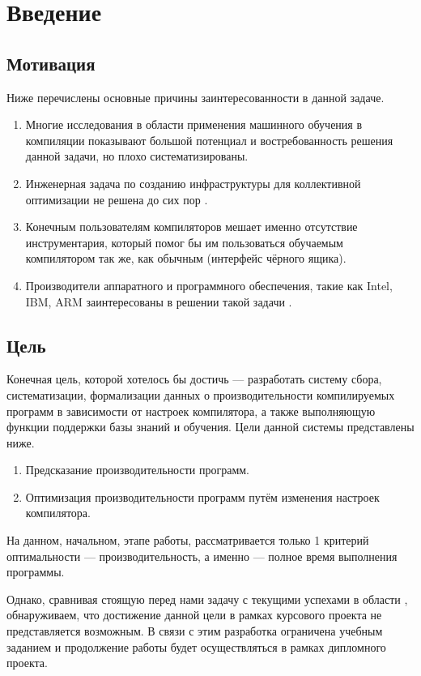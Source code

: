\section{Введение}


\subsection{Мотивация}
Ниже перечислены основные причины заинтересованности в данной задаче.
\begin{enumerate}
    \item Многие исследования в области применения машинного обучения в компиляции \cite{Dubach2009PCO,Thomson2009RTT,Stephenson2003MOI} показывают большой потенциал и востребованность решения данной задачи, но плохо систематизированы.
    \item Инженерная задача по созданию инфраструктуры для коллективной оптимизации не решена до сих пор \cite{Fursin2010COP}.
    \item Конечным пользователям компиляторов мешает именно отсутствие инструментария, который помог бы им пользоваться обучаемым компилятором так же, как обычным (интерфейс чёрного ящика).
    \item Производители аппаратного и программного обеспечения, такие как Intel, IBM, ARM заинтересованы в решении такой задачи \cite{IntelExascale}.
\end{enumerate}


\subsection{Цель}
Конечная цель, которой хотелось бы достичь --- разработать систему сбора, систематизации, формализации данных о производительности компилируемых программ в зависимости от настроек компилятора, а также выполняющую функции поддержки базы знаний и обучения. Цели данной системы представлены ниже.
\begin{enumerate}
    \item Предсказание производительности программ.
    \item Оптимизация производительности программ путём изменения настроек компилятора.
\end{enumerate}

На данном, начальном, этапе работы, рассматривается только 1 критерий оптимальности --- производительность, а именно --- полное время выполнения программы.

Однако, сравнивая стоящую перед нами задачу с текущими успехами в области \cite{Fursin2010COP}, обнаруживаем, что достижение данной цели в рамках курсового проекта не представляется возможным. В связи с этим разработка ограничена учебным заданием и продолжение работы будет осуществляться в рамках дипломного проекта.


